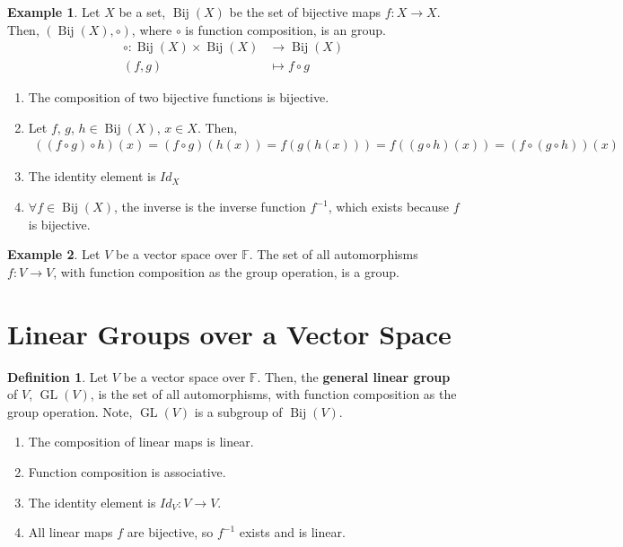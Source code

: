 \documentclass[letterpaper,12pt]{article}
\theoremstyle{definition}
\newtheorem*{definition}{Definition}
\newtheorem*{example}{Example}
\begin{document}
\begin{example}
Let $X$ be a set, $\operatorname{Bij}(X)$ be the set of bijective maps $f: X \rightarrow X$. Then, $(\operatorname{Bij}(X), \circ)$, where $\circ$ is function composition, is an group.
\begin{align*}
    \circ: \operatorname{Bij}(X) \times \operatorname{Bij}(X) & \longrightarrow \operatorname{Bij}(X) \\
    (f,g) & \longmapsto f \circ g
\end{align*}
\begin{enumerate}
    \item The composition of two bijective functions is bijective.
    \item Let $f$, $g$, $h \in \operatorname{Bij}(X)$, $x \in X$. Then,
    \begin{align*}
        ((f \circ g) \circ h)(x) = (f \circ g)(h(x)) = f(g(h(x))) = f((g \circ h)(x)) = (f \circ (g \circ h))(x)
    \end{align*}
    \item The identity element is $Id_{X}$
    \item $\forall f \in \operatorname{Bij}(X)$, the inverse is the inverse function $f^{-1}$, which exists because $f$ is bijective.
\end{enumerate}
\end{example}

\begin{example}
Let $V$ be a vector space over $\mathbb{F}$. The set of all automorphisms $f: V \rightarrow V$, with function composition as the group operation, is a group.
\end{example}

\section*{Linear Groups over a Vector Space}
\begin{definition}
Let $V$ be a vector space over $\mathbb{F}$. Then, the \textbf{general linear group} of $V$, $\operatorname{GL}(V)$, is the set of all automorphisms, with function composition as the group operation. Note, $\operatorname{GL}(V)$ is a subgroup of $\operatorname{Bij}(V)$.
\begin{enumerate}
    \item The composition of linear maps is linear.
    \item Function composition is associative.
    \item The identity element is $Id_{V}: V \rightarrow V$.
    \item All linear maps $f$ are bijective, so $f^{-1}$ exists and is linear.
\end{enumerate}
\end{definition}
\end{document}
